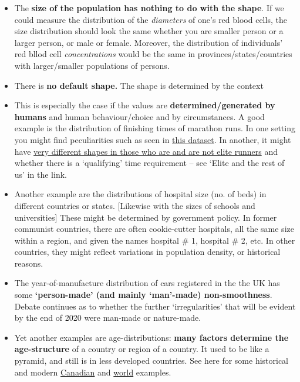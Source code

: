 \documentclass[]{book}
\begin{document}
\begin{itemize}
\item
  The \textbf{size of the population has nothing to do with the shape}. If we could measure the distribution of the \emph{diameters} of one's red blood cells, the size distribution should look the same whether you are smaller person or a larger person, or male or female. Moreover, the distribution of individuals' red bllod cell \emph{concentrations} would be the same in provinces/states/countries with larger/smaller populations of persons.
\item
  There is \textbf{no default shape.} The shape is determined by the context
\item
  This is especially the case if the values are \textbf{determined/generated by humans} and human behaviour/choice and by circumstances. A good example is the distribution of finishing times of marathon runs. In one setting you might find peculiarities such as seen in
  \href{http://www.medicine.mcgill.ca/epidemiology/hanley/statbook/HumanBehaviourDistributionsMarathons.pdf\#page=14}{this dataset}. In another, it might have \href{https://susanli2016.github.io/Boston-Marathon/}{very different shapes in those who are and are not elite runners} and whether there is a `qualifying' time requirement -- see `Elite and the rest of us' in the link.
\item
  Another example are the distributions of hospital size (no. of beds) in different countries or states. {[}Likewise with the sizes of schools and universities{]} These might be determined by government policy. In former communist countries, there are often cookie-cutter hospitals, all the same size within a region, and given the names hospital \# 1, hospital \# 2, etc. In other countries, they might reflect variations in population density, or historical reasons.
\item
  The year-of-manufacture distribution of cars registered in the the UK has some \textbf{`person-made' (and mainly `man'-made) non-smoothness}. Debate continues as to whether the further `irregularities' that will be evident by the end of 2020 were man-made or nature-made.
\item
  Yet another examples are age-distributions: \textbf{many factors determine the age-structure} of a country or region of a country. It used to be like a pyramid, and still is in less developed countries. See here for some historical and modern
  \href{https://www12.statcan.gc.ca/census-recensement/2016/dp-pd/pyramid/pyramid.cfm?type=1\&geo1=01}{Canadian} and \href{https://www.visualcapitalist.com/animation-population-pyramids-10-biggest-countries/}{world} examples.

\end{itemize}
\end{document}
